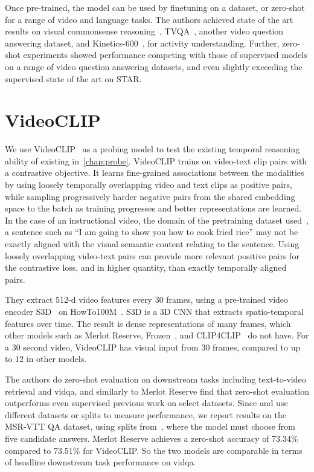 Once pre-trained, the model can be used by finetuning on a dataset, or
zero-shot for a range of video and language tasks. The authors achieved state
of the art results on visual commonsense reasoning~\citep{zellers2019vcr},
TVQA~\citep{antol2015vqa}, another video question answering dataset, and
Kinetics-600~\citep{carreira2018kinetics600}, for activity understanding.
Further, zero-shot experiments showed performance competing with those of
supervised models on a range of video question answering datasets, and even
slightly exceeding the supervised state of the art on STAR.

\section{VideoCLIP}
\label{sec:videoclip}

We use VideoCLIP~\citep{xu2021videoclip} as a probing model to test the
existing temporal reasoning ability of existing 
in~\cref{chap:probe}. VideoCLIP trains on video-text clip pairs with a
contrastive objective. It learns fine-grained associations between the
modalities by using loosely temporally overlapping video and text clips as
positive pairs, while sampling progressively harder negative pairs from the
shared embedding space to the batch as training progresses and better
representations are learned. In the case of an instructional video, the domain
of the pretraining dataset used~\citep{miech2019howto100m}, a sentence such as
``I am going to show you how to cook fried rice'' may not be exactly aligned
with the visual semantic content relating to the sentence. Using loosely
overlapping video-text pairs can provide more relevant positive pairs for the
contrastive loss, and in higher quantity, than exactly temporally aligned
pairs. 

They extract 512-d video features every 30 frames, using a pre-trained video
encoder S3D~\citep{xie2018s3d} on HowTo100M~\citep{miech2019howto100m}. S3D is
a 3D CNN that extracts spatio-temporal features over time. The result is dense
representations of many frames, which other models such as Merlot Reserve,
Frozen~\citep{bain2021frozen}, and CLIP4CLIP~\citep{luo2022clip4clip} do not
have. For a 30 second video, VideoCLIP has visual input from 30 frames,
compared to up to 12 in other models.

The authors do zero-shot evaluation on downstream tasks including
text-to-video retrieval and \acrshort{vidqa}, and similarly to Merlot Reserve
find that zero-shot evaluation outperforms even supervised previous work on
select datasets. Since \citet{zellers2022mreserve} and \citet{xu2021videoclip} use
different datasets or splits to measure performance, we report results on
the MSR-VTT QA dataset, using splits from~\citet{xu2017video}, where the
model must choose from five candidate answers. Merlot Reserve achieves a
zero-shot accuracy of 73.34\% compared to 73.51\% for VideoCLIP. So the two
models are comparable in terms of headline downstream task performance on
\acrlong{vidqa}.
